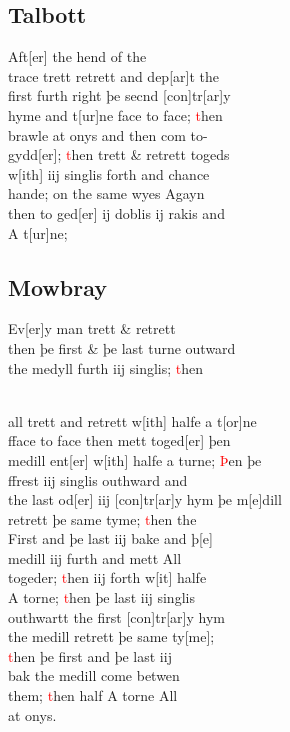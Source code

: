 \documentclass[12pt,letter]{article} %
\newcommand{\red}[1]{\textcolor{red}{#1}}
\newcommand{\srcpg}[1]{
    \noindent{
        \color{Gray}{\rule[0.5ex]{\linewidth}{1pt}~#1} 
    
    }
}
\begin{document}
    \subsection{Talbott}
Aft{[}er{]} the hend of the \\ 
trace trett retrett and dep{[}ar{]}t the \\ 
first furth right þe secnd {[}con{]}tr{[}ar{]}y \\ 
hyme and t{[}ur{]}ne face to face; \red{t}hen \\ 
brawle at onys and then com to-\\ 
gydd{[}er{]}; \red{t}hen trett \& retrett togeds \\ 
w{[}ith{]} iij singlis forth and chance \\
hande; on the same wyes Agayn \\ 
then to ged{[}er{]} ij doblis ij rakis and \\ 
A t{[}ur{]}ne;

    \subsection{Mowbray}
Ev{[}er{]}y man trett \& retrett \\ 
then þe first \& þe last turne outward \\ 
the medyll furth iij singlis; \red{t}hen  \\
\ 
\srcpg{56} 
all trett and retrett w{[}ith{]} halfe a t{[}or{]}ne \\ 
fface to face then mett toged{[}er{]} þen \\
medill ent{[}er{]} w{[}ith{]} halfe a turne; \red{Þ}en þe \\
 ffrest iij singlis outhward and \\
the last od{[}er{]} iij {[}con{]}tr{[}ar{]}y hym þe m{[}e{]}dill \\ 
retrett þe same tyme; \red{t}hen the \\
First and þe last iij bake and þ[e] \\
medill iij furth and mett All \\ 
togeder; \red{t}hen iij forth w{[}it{]} halfe \\ 
A torne; \red{t}hen þe last iij singlis \\ 
outhwartt the first {[}con{]}tr{[}ar{]}y hym \\ 
the medill retrett þe same ty[me]; \\ 
\red{t}hen þe first and þe last iij \\
bak the medill come betwen \\ 
them; \red{t}hen half A torne All \\ at onys.
\end{document}
